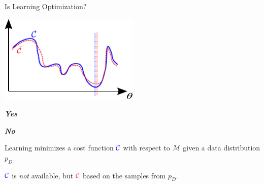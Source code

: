 \documentclass[first=dgreen,second=purple,logo=yellowexc]{aaltoslides}
\newcommand{\CC}[0]{\mathcal{C}}
\newcommand{\MM}[0]{\mathcal{M}}
\begin{document}
\begin{frame}{Is Learning Optimization?}

    \centering
    \includegraphics[width=0.5\textwidth]{cost_both.pdf}

    \begin{minipage}{0.48\textwidth}
        \textbf{\emph{Yes}}
    \end{minipage}
    \hfill
    \begin{minipage}{0.48\textwidth}
        \textbf{\emph{No}}
    \end{minipage}


    \begin{minipage}[t]{0.48\textwidth}
        \vspace{0pt}
    Learning minimizes a cost function $\color{blue}{\CC}$ with respect to
    $\MM$ given a data distribution $p_D$

    \end{minipage}
    \hfill
    \begin{minipage}[t]{0.48\textwidth}
        \vspace{0pt}
    $\color{blue}{\CC}$ is \emph{not} available, but $\color{red}{\tilde{\CC}}$ based
    on the samples from $p_D$.

    \end{minipage}

\end{frame}
\end{document}
